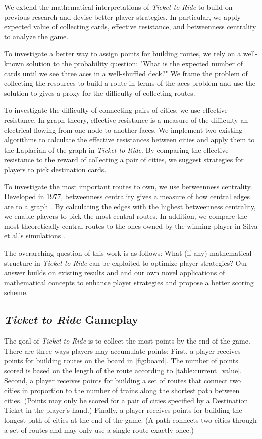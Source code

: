 We extend the mathematical interpretations of
\textit{Ticket to Ride} to build on previous research
and devise better player strategies.
In particular, we apply expected value of collecting cards,
effective resistance, and betweenness centrality to
analyze the game.

To investigate a better way to assign points for building routes,
we rely on a well-known solution to the probability question:
"What is the expected number of cards until
we see three aces in a well-shuffled deck?"
We frame the problem of collecting the resources
to build a route in terms of the aces problem
and use the solution to gives a proxy for the difficulty
of collecting routes.

To investigate the difficulty of connecting pairs of cities,
we use effective resistance.
In graph theory, effective resistance is a measure of the 
difficulty an electrical flowing from one node to another faces.
We implement two existing algorithms to calculate
the effective resistances between cities
\cite{ellens2011effective, wu2004theory}
and apply them to the Laplacian of the graph in \textit{Ticket to Ride}.
By comparing the effective resistance to the reward
of collecting a pair of cities, we suggest
strategies for players to pick destination cards.

To investigate the most important routes to own,
we use betweenness centrality.
Developed in 1977, betweenness centrality gives a measure
of how central edges are to a graph
\cite{freeman1977set}.
By calculating the edges with the highest betweenness centrality,
we enable players to pick the most central routes.
In addition, we compare the most theoretically central routes
to the ones owned by the winning player in Silva et al.'s
simulations \cite{de2017playtesting}.

The overarching question of this work is as follows:
What (if any) mathematical structure in \textit{Ticket to Ride}
can be exploited to optimize player strategies?
Our answer builds on existing results and
and our own novel applications of mathematical concepts to enhance
player strategies and propose a better scoring scheme.

\subsection{\textit{Ticket to Ride} Gameplay}

The goal of \textit{Ticket to Ride} is to collect
the most points by the end of the game.
There are three ways players may accumulate points:
First, a player receives points for building routes
on the board in \cref{fig:board}.
The number of points scored is based on the length of the route
according to  \cref{table:current_value}.
Second, a player receives points for building
a set of routes that connect two cities in proportion
to the number of trains along the shortest path between cities.
(Points may only be scored for a pair of cities specified by a 
Destination Ticket in the player's hand.)
Finally, a player receives points for building
the longest path of cities at the end of the game.
(A path connects two cities through a set
of routes and may only use a single route exactly once.)

